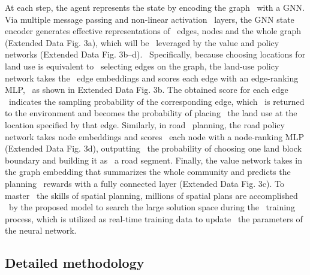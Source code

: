 At each step, the agent represents the state by encoding the graph \
with a GNN. Via multiple message passing and non-linear activation \
layers, the GNN state encoder generates effective representations of \
edges, nodes and the whole graph (Extended Data Fig. 3a), which will be \
leveraged by the value and policy networks (Extended Data Fig. 3b–d). \
Specifically, because choosing locations for land use is equivalent to \
selecting edges on the graph, the land-use policy network takes the \
edge embeddings and scores each edge with an edge-ranking MLP, \
as shown in Extended Data Fig. 3b. The obtained score for each edge \
indicates the sampling probability of the corresponding edge, which \
is returned to the environment and becomes the probability of placing \
the land use at the location specified by that edge. Similarly, in road \
planning, the road policy network takes node embeddings and scores \
each node with a node-ranking MLP (Extended Data Fig. 3d), outputting \
the probability of choosing one land block boundary and building it as \
a road segment. Finally, the value network takes in the graph embedding that summarizes the whole community and predicts the planning \
rewards with a fully connected layer (Extended Data Fig. 3c). To master \
the skills of spatial planning, millions of spatial plans are accomplished \
by the proposed model to search the large solution space during the \
training process, which is utilized as real-time training data to update \
the parameters of the neural network.\\
\subsection{Detailed methodology}

